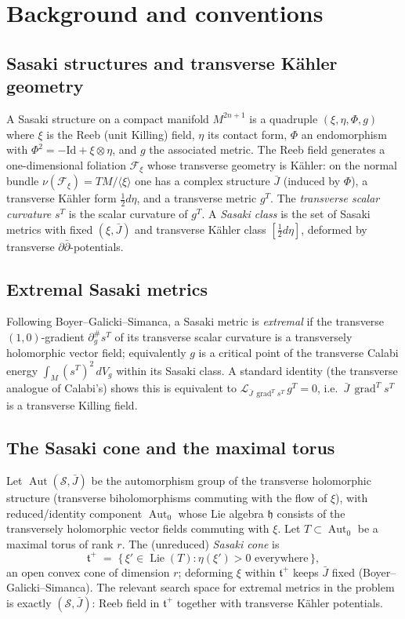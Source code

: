 \documentclass{amsart}
\theoremstyle{definition}
\DeclareMathOperator{\Aut}{Aut}
\DeclareMathOperator{\Lie}{Lie}
\DeclareMathOperator{\grad}{grad}
\begin{document}
\section{Background and conventions}\label{sec:bg}

\subsection{Sasaki structures and transverse K\"ahler geometry}
A Sasaki structure on a compact manifold $M^{2n+1}$ is a quadruple
$(\xi,\eta,\Phi,g)$ where $\xi$ is the Reeb (unit Killing) field, $\eta$ its
contact form, $\Phi$ an endomorphism with $\Phi^2=-\mathrm{Id}+\xi\otimes\eta$,
and $g$ the associated metric. The Reeb field generates a one-dimensional
foliation $\mathcal F_\xi$ whose transverse geometry is K\"ahler: on the normal
bundle $\nu(\mathcal F_\xi)=TM/\langle\xi\rangle$ one has a complex structure
$\bar J$ (induced by $\Phi$), a transverse K\"ahler form $\frac12 d\eta$, and a
transverse metric $g^T$. The \emph{transverse scalar curvature} $s^T$ is the
scalar curvature of $g^T$. A \emph{Sasaki class} is the set of Sasaki metrics
with fixed $(\xi,\bar J)$ and transverse K\"ahler class $[\frac12 d\eta]$,
deformed by transverse $\partial\bar\partial$-potentials.

\subsection{Extremal Sasaki metrics}
Following Boyer--Galicki--Simanca, a Sasaki metric is \emph{extremal} if the
transverse $(1,0)$-gradient $\partial^\#_g s^T$ of its transverse scalar
curvature is a transversely holomorphic vector field; equivalently $g$ is a
critical point of the transverse Calabi energy $\int_M (s^T)^2\,dV_g$ within
its Sasaki class. A standard identity (the transverse analogue of Calabi's)
shows this is equivalent to $\mathcal L_{\bar J\,\grad^T s^T}\,g^T=0$, i.e.\
$\bar J\,\grad^T s^T$ is a transverse Killing field.

\subsection{The Sasaki cone and the maximal torus}
Let $\Aut(\mathcal S,\bar J)$ be the automorphism group of the transverse
holomorphic structure (transverse biholomorphisms commuting with the flow of
$\xi$), with reduced/identity component $\Aut_0$ whose Lie algebra
$\mathfrak h$ consists of the transversely holomorphic vector fields commuting
with $\xi$. Let $T\subset\Aut_0$ be a maximal torus of rank $r$. The
(unreduced) \emph{Sasaki cone} is
\[
  \mathfrak t^+ \;=\; \{\,\xi'\in\Lie(T) : \eta(\xi')>0 \text{ everywhere}\,\},
\]
an open convex cone of dimension $r$; deforming $\xi$ within $\mathfrak t^+$
keeps $\bar J$ fixed (Boyer--Galicki--Simanca). The relevant search space for
extremal metrics in the problem is exactly $(\mathcal S,\bar J)$: Reeb field in
$\mathfrak t^+$ together with transverse K\"ahler potentials.
\end{document}
